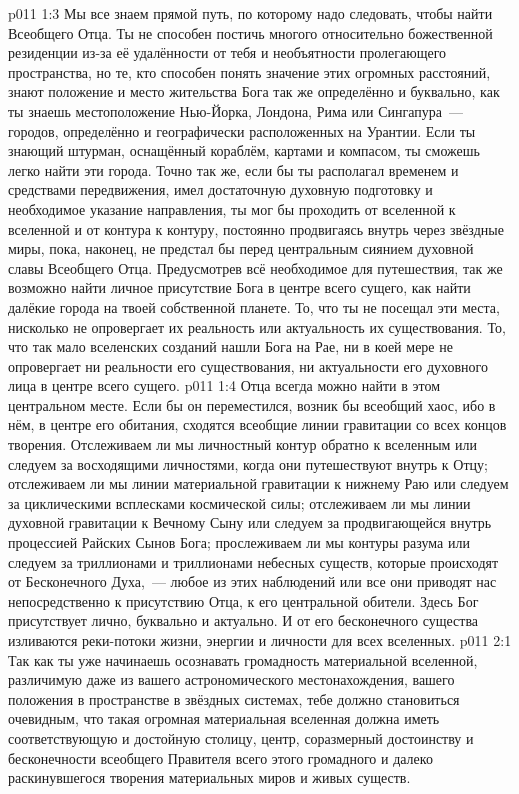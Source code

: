 \vs p011 1:3 \pc Мы все знаем прямой путь, по которому надо следовать, чтобы найти Всеобщего Отца. Ты не способен постичь многого относительно божественной резиденции из-за её удалённости от тебя и необъятности пролегающего пространства, но те, кто способен понять значение этих огромных расстояний, знают положение и место жительства Бога так же определённо и буквально, как ты знаешь местоположение Нью\hyp{}Йорка, Лондона, Рима или Сингапура~--- городов, определённо и географически расположенных на Урантии. Если ты знающий штурман, оснащённый кораблём, картами и компасом, ты сможешь легко найти эти города. Точно так же, если бы ты располагал временем и средствами передвижения, имел достаточную духовную подготовку и необходимое указание направления, ты мог бы проходить от вселенной к вселенной и от контура к контуру, постоянно продвигаясь внутрь через звёздные миры, пока, наконец, не предстал бы перед центральным сиянием духовной славы Всеобщего Отца. Предусмотрев всё необходимое для путешествия, так же возможно найти личное присутствие Бога в центре всего сущего, как найти далёкие города на твоей собственной планете. То, что ты не посещал эти места, нисколько не опровергает их реальность или актуальность их существования. То, что так мало вселенских созданий нашли Бога на Рае, ни в коей мере не опровергает ни реальности его существования, ни актуальности его духовного лица в центре всего сущего.
\vs p011 1:4 Отца всегда можно найти в этом центральном месте. Если бы он переместился, возник бы всеобщий хаос, ибо в нём, в центре его обитания, сходятся всеобщие линии гравитации со всех концов творения. Отслеживаем ли мы личностный контур обратно к вселенным или следуем за восходящими личностями, когда они путешествуют внутрь к Отцу; отслеживаем ли мы линии материальной гравитации к нижнему Раю или следуем за циклическими всплесками космической силы; отслеживаем ли мы линии духовной гравитации к Вечному Сыну или следуем за продвигающейся внутрь процессией Райских Сынов Бога; прослеживаем ли мы контуры разума или следуем за триллионами и триллионами небесных существ, которые происходят от Бесконечного Духа,~--- любое из этих наблюдений или все они приводят нас непосредственно к присутствию Отца, к его центральной обители. Здесь Бог присутствует лично, буквально и актуально. И от его бесконечного существа изливаются реки\hyp{}потоки жизни, энергии и личности для всех вселенных.
\vs p011 2:1 Так как ты уже начинаешь осознавать громадность материальной вселенной, различимую даже из вашего астрономического местонахождения, вашего положения в пространстве в звёздных системах, тебе должно становиться очевидным, что такая огромная материальная вселенная должна иметь соответствующую и достойную столицу, центр, соразмерный достоинству и бесконечности всеобщего Правителя всего этого громадного и далеко раскинувшегося творения материальных миров и живых существ.
